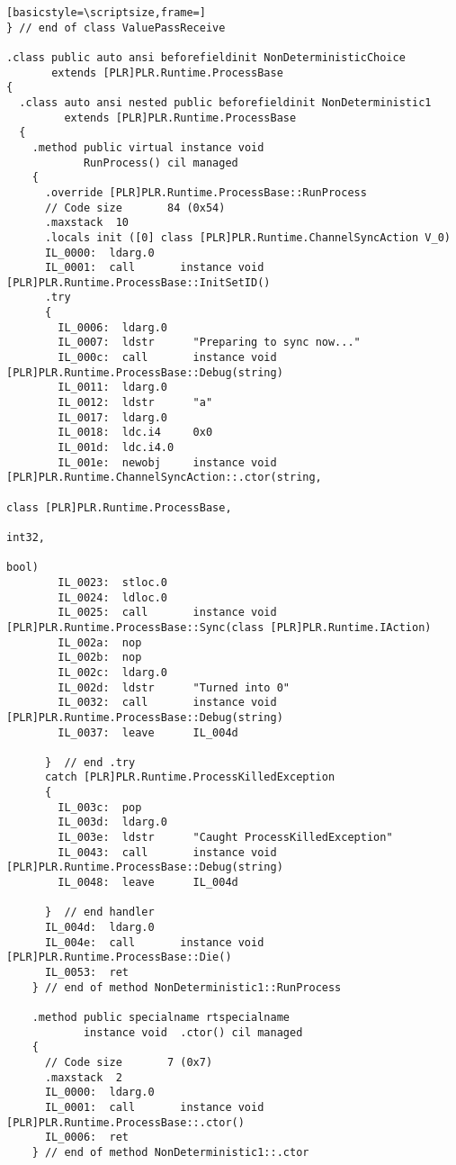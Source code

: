 \begin{lstlisting}[basicstyle=\scriptsize,frame=]
} // end of class ValuePassReceive

.class public auto ansi beforefieldinit NonDeterministicChoice
       extends [PLR]PLR.Runtime.ProcessBase
{
  .class auto ansi nested public beforefieldinit NonDeterministic1
         extends [PLR]PLR.Runtime.ProcessBase
  {
    .method public virtual instance void 
            RunProcess() cil managed
    {
      .override [PLR]PLR.Runtime.ProcessBase::RunProcess
      // Code size       84 (0x54)
      .maxstack  10
      .locals init ([0] class [PLR]PLR.Runtime.ChannelSyncAction V_0)
      IL_0000:  ldarg.0
      IL_0001:  call       instance void [PLR]PLR.Runtime.ProcessBase::InitSetID()
      .try
      {
        IL_0006:  ldarg.0
        IL_0007:  ldstr      "Preparing to sync now..."
        IL_000c:  call       instance void [PLR]PLR.Runtime.ProcessBase::Debug(string)
        IL_0011:  ldarg.0
        IL_0012:  ldstr      "a"
        IL_0017:  ldarg.0
        IL_0018:  ldc.i4     0x0
        IL_001d:  ldc.i4.0
        IL_001e:  newobj     instance void [PLR]PLR.Runtime.ChannelSyncAction::.ctor(string,
                                                                                     class [PLR]PLR.Runtime.ProcessBase,
                                                                                     int32,
                                                                                     bool)
        IL_0023:  stloc.0
        IL_0024:  ldloc.0
        IL_0025:  call       instance void [PLR]PLR.Runtime.ProcessBase::Sync(class [PLR]PLR.Runtime.IAction)
        IL_002a:  nop
        IL_002b:  nop
        IL_002c:  ldarg.0
        IL_002d:  ldstr      "Turned into 0"
        IL_0032:  call       instance void [PLR]PLR.Runtime.ProcessBase::Debug(string)
        IL_0037:  leave      IL_004d

      }  // end .try
      catch [PLR]PLR.Runtime.ProcessKilledException 
      {
        IL_003c:  pop
        IL_003d:  ldarg.0
        IL_003e:  ldstr      "Caught ProcessKilledException"
        IL_0043:  call       instance void [PLR]PLR.Runtime.ProcessBase::Debug(string)
        IL_0048:  leave      IL_004d

      }  // end handler
      IL_004d:  ldarg.0
      IL_004e:  call       instance void [PLR]PLR.Runtime.ProcessBase::Die()
      IL_0053:  ret
    } // end of method NonDeterministic1::RunProcess

    .method public specialname rtspecialname 
            instance void  .ctor() cil managed
    {
      // Code size       7 (0x7)
      .maxstack  2
      IL_0000:  ldarg.0
      IL_0001:  call       instance void [PLR]PLR.Runtime.ProcessBase::.ctor()
      IL_0006:  ret
    } // end of method NonDeterministic1::.ctor


\end{lstlisting}
